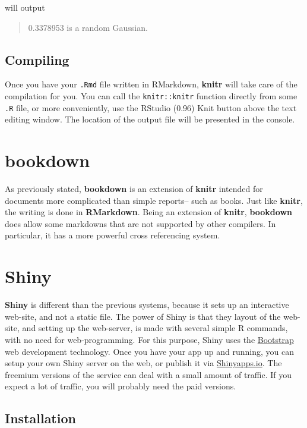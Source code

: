 \documentclass[]{book}
\theoremstyle{definition}
\theoremstyle{definition}
\theoremstyle{remark}
\begin{document}
will output

\begin{quote}
0.3378953 is a random Gaussian.
\end{quote}

\subsection{Compiling}\label{compiling}

Once you have your \texttt{.Rmd} file written in RMarkdown,
\textbf{knitr} will take care of the compilation for you. You can call
the \texttt{knitr::knitr} function directly from some \texttt{.R} file,
or more conveniently, use the RStudio (0.96) Knit button above the text
editing window. The location of the output file will be presented in the
console.

\section{bookdown}\label{bookdown}

As previously stated, \textbf{bookdown} is an extension of
\textbf{knitr} intended for documents more complicated than simple
reports-- such as books. Just like \textbf{knitr}, the writing is done
in \textbf{RMarkdown}. Being an extension of \textbf{knitr},
\textbf{bookdown} does allow some markdowns that are not supported by
other compilers. In particular, it has a more powerful cross referencing
system.

\section{Shiny}\label{shiny}

\textbf{Shiny} \citep{shiny} is different than the previous systems,
because it sets up an interactive web-site, and not a static file. The
power of Shiny is that they layout of the web-site, and setting up the
web-server, is made with several simple R commands, with no need for
web-programming. For this purpose, Shiny uses the
\href{http://getbootstrap.com}{Bootstrap} web development technology.
Once you have your app up and running, you can setup your own Shiny
server on the web, or publish it via
\href{https://www.shinyapps.io/}{Shinyapps.io}. The freemium versions of
the service can deal with a small amount of traffic. If you expect a lot
of traffic, you will probably need the paid versions.

\subsection{Installation}\label{installation-1}
\end{document}
